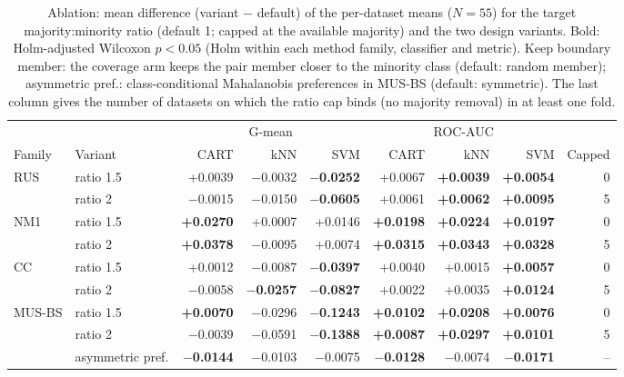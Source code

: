 \begin{table}[!htbp]
\centering
\caption{Ablation: mean difference (variant $-$ default) of the per-dataset means ($N=55$) for the target majority:minority ratio (default 1; capped at the available majority) and the two design variants. Bold: Holm-adjusted Wilcoxon $p<0.05$ (Holm within each method family, classifier and metric). Keep boundary member: the coverage arm keeps the pair member closer to the minority class (default: random member); asymmetric pref.: class-conditional Mahalanobis preferences in MUS-BS (default: symmetric). The last column gives the number of datasets on which the ratio cap binds (no majority removal) in at least one fold.}
\label{tab:ablation}
\scriptsize
\setlength{\tabcolsep}{3pt}
\begin{adjustbox}{max width=\linewidth}
\begin{tabular}{llrrrrrrr}
\toprule
 & & \multicolumn{3}{c}{G-mean} & \multicolumn{3}{c}{ROC-AUC} & \\
\cmidrule(lr){3-5}\cmidrule(lr){6-8}
Family & Variant & CART & kNN & SVM & CART & kNN & SVM & Capped \\
\midrule
RUS & ratio 1.5 & +0.0039 & $-$0.0032 & \textbf{$-$0.0252} & +0.0067 & \textbf{+0.0039} & \textbf{+0.0054} & 0 \\
 & ratio 2 & $-$0.0015 & $-$0.0150 & \textbf{$-$0.0605} & +0.0061 & \textbf{+0.0062} & \textbf{+0.0095} & 5 \\
\midrule
NM1 & ratio 1.5 & \textbf{+0.0270} & +0.0007 & +0.0146 & \textbf{+0.0198} & \textbf{+0.0224} & \textbf{+0.0197} & 0 \\
 & ratio 2 & \textbf{+0.0378} & $-$0.0095 & +0.0074 & \textbf{+0.0315} & \textbf{+0.0343} & \textbf{+0.0328} & 5 \\
\midrule
CC & ratio 1.5 & +0.0012 & $-$0.0087 & \textbf{$-$0.0397} & +0.0040 & +0.0015 & \textbf{+0.0057} & 0 \\
 & ratio 2 & $-$0.0058 & \textbf{$-$0.0257} & \textbf{$-$0.0827} & +0.0022 & +0.0035 & \textbf{+0.0124} & 5 \\
\midrule
MUS-BS & ratio 1.5 & \textbf{+0.0070} & $-$0.0296 & \textbf{$-$0.1243} & \textbf{+0.0102} & \textbf{+0.0208} & \textbf{+0.0076} & 0 \\
 & ratio 2 & $-$0.0039 & $-$0.0591 & \textbf{$-$0.1388} & \textbf{+0.0087} & \textbf{+0.0297} & \textbf{+0.0101} & 5 \\
 & asymmetric pref. & \textbf{$-$0.0144} & $-$0.0103 & $-$0.0075 & \textbf{$-$0.0128} & $-$0.0074 & \textbf{$-$0.0171} & -- \\

\end{tabular}
\end{adjustbox}
\end{table}

